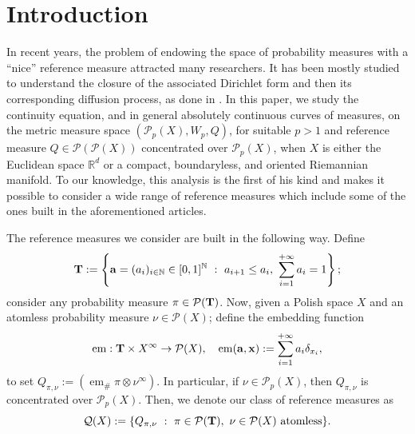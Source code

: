 \documentclass[10pt,leqno]{amsart}
\numberwithin{equation}{section}
\newcommand{\R}{\mathbb{R}}
\newcommand{\Q}{\mathbb{Q}}
\newcommand{\N}{\mathbb{N}}
\newcommand{\PP}{\mathcal{P}}
\renewcommand{\Q}{Q}
\begin{document}
 \section{Introduction}
In recent years, the problem of endowing the space of probability measures with a ``nice'' reference measure attracted many researchers. 
It has been mostly studied to understand the closure of the associated Dirichlet form and then its corresponding diffusion process, as done in \cite{dello2022dirichlet, delloschiavo2024massive, schiavo2025hellinger, marx2018new, konarovskyi2019modified, von2009entropic, sturm2024wasserstein, ren2024diffusion, ren2024ornstein}. In this paper, we study the continuity equation, and in general absolutely continuous curves of measures, on the metric measure space $(\PP_p(X),W_p,\Q)$, for suitable $p>1$ and reference measure $\Q\in \PP(\PP(X))$ concentrated over $\PP_p(X)$, when $X$ is either the Euclidean space $\R^d$ or a compact, boundaryless, and oriented Riemannian manifold. To our knowledge, this analysis is the first of his kind and makes it possible to consider a wide range of reference measures which include some of the ones built in the aforementioned articles.




The reference measures we consider are built in the following way. Define 
\begin{equation}\label{inf simplex intro}
\bold{T} := \left\{ \bold{a}=(a_i)_{i\in \N} \in [0,1]^\N \ : \ a_{i+1}\leq a_i, \ \sum_{i=1}^{+\infty} a_i = 1 \right\};
\end{equation} 
consider any probability measure $\pi\in \PP(\bold{T})$. Now, given a Polish space $X$ and an atomless probability measure $\nu\in \PP(X)$; define the embedding function  
\begin{equation}\label{eq: embedding atomic}
\begin{aligned}
    \operatorname{em}:\bold{T} \times X^\infty  \to \PP(X),\quad
    \operatorname{em}(\bold{a}, \bold{x})  := \sum_{i=1}^{+\infty} a_i \delta_{x_i},
\end{aligned}    
\end{equation}
to set $\Q_{\pi,\nu}:= (\operatorname{em}_\# \pi \otimes \nu^{\infty})$. In particular, if $\nu\in \PP_p(X)$, then $\Q_{\pi,\nu}$ is concentrated over $\PP_p(X)$. Then, we denote our class of reference measures as
\begin{equation}\label{eq: ref meas class intro}
    \mathcal{Q}(X):= \{\Q_{\pi,\nu} \ : \ \pi \in \PP(\bold{T}), \ \nu\in \PP(X) \text{ atomless}\}.
\end{equation}
\end{document}
